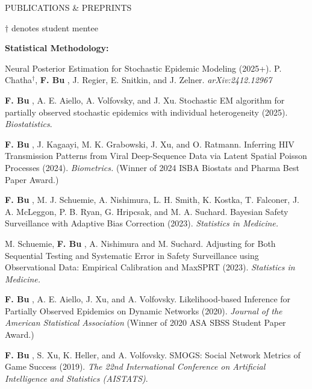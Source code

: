 \documentclass{resume} %
\newcommand{\thisYear}[1]{
	#1
}
\newcommand{\myName}[1]{
	\textbf{#1}
}
\begin{document}


\begin{rSection}{PUBLICATIONS \& PREPRINTS}

{\footnotesize $\dagger$ denotes student mentee}

\hspace{-.2in} \textbf{Statistical Methodology:}

Neural Posterior Estimation for Stochastic Epidemic Modeling (2025+). P. Chatha$^\dagger$, \myName{F. Bu}, J. Regier, E. Snitkin, and J. Zelner. 	\textit{arXiv:2412.12967}

\smallskip

\thisYear{
\myName{F. Bu}, A. E. Aiello, A. Volfovsky, and J. Xu.  
Stochastic EM algorithm for partially observed stochastic epidemics with individual heterogeneity (2025).  \emph{Biostatistics}.%
}

\smallskip

\myName{F. Bu}, J. Kagaayi, M. K. Grabowski, J. Xu, and O. Ratmann.
Inferring HIV Transmission Patterns from Viral Deep-Sequence Data via Latent Spatial Poisson Processes (2024). \emph{Biometrics.} 
(Winner of 2024 ISBA Biostats and Pharma Best Paper Award.)

\smallskip

\myName{F. Bu}, M. J. Schuemie,  A. Nishimura, L. H. Smith, K. Kostka, T. Falconer, J. A. McLeggon, P. B. Ryan, G. Hripcsak, and M. A. Suchard.
Bayesian Safety Surveillance with Adaptive Bias Correction (2023). \emph{Statistics in Medicine.} %

\smallskip


M. Schuemie, \myName{F. Bu}, A. Nishimura and M. Suchard.
Adjusting for Both Sequential Testing and Systematic Error in Safety Surveillance using Observational Data: Empirical Calibration and MaxSPRT (2023). \emph{Statistics in Medicine.}

\smallskip


\myName{F. Bu}, A. E. Aiello, J. Xu, and A. Volfovsky. 
Likelihood-based Inference for Partially Observed Epidemics on Dynamic Networks (2020). \emph{Journal of the American Statistical Association} (Winner of 2020 ASA SBSS Student Paper Award.) %

\smallskip

\myName{F. Bu}, S. Xu, K. Heller, and A. Volfovsky. 
SMOGS: Social Network Metrics of Game Success (2019). \emph{The 22nd International Conference on Artificial Intelligence and Statistics (AISTATS)}. %


\end{rSection}
\end{document}
